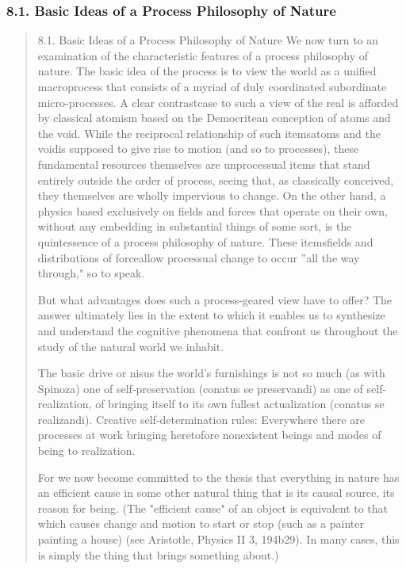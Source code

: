 \documentclass[a4paper]{Thesis}
\begin{document}
	\subsubsection{8.1. Basic Ideas of a Process Philosophy of Nature}
	\begin{quotation}
		8.1. Basic Ideas of a Process Philosophy of Nature
		We now turn to an examination of the characteristic features of a process philosophy of
		nature. The basic idea of the process is to view the world as a unified macroprocess that
		consists of a myriad of duly coordinated subordinate micro-processes. A clear contrastcase
		to such a view of the real is afforded by classical atomism based on the Democritean
		conception of atoms and the void. While the reciprocal relationship of such itemsatoms
		and the voidis supposed to give rise to motion (and so to processes), these fundamental
		resources themselves are unprocessual items that stand entirely outside the order of
		process, seeing that, as classically conceived, they themselves are wholly impervious to
		change. On the other hand, a physics based exclusively on fields and forces that operate
		on their own, without any embedding in substantial things of some sort, is the
		quintessence of a process philosophy of nature. These itemsfields and distributions of
		forceallow processual change to occur ''all the way through," so to speak.	
		
		But what advantages does such a process-geared view have to offer? The answer
		ultimately lies in the extent to which it enables us to synthesize and understand the
		cognitive phenomena that confront us throughout the study of the natural world we
		inhabit.
		
		The basic drive or nisus the
		world's furnishings is not so much (as with Spinoza) one of self-preservation (conatus se
		preservandi) as one of self-realization, of bringing itself to its own fullest actualization
		(conatus se realizandi). Creative self-determination rules: Everywhere there are
		processes at work bringing heretofore nonexistent beings and modes of being to
		realization.
		
		For we now become committed to the thesis that everything
		in nature has an efficient cause in some other natural thing that is its causal source, its
		reason for being.
		(The "efficient cause" of an object is equivalent to that which causes change and motion to start or stop (such as a painter painting a house) (see Aristotle, Physics II 3, 194b29). In many cases, this is simply the thing that brings something about.)
		

\end{quotation}
\end{document}
